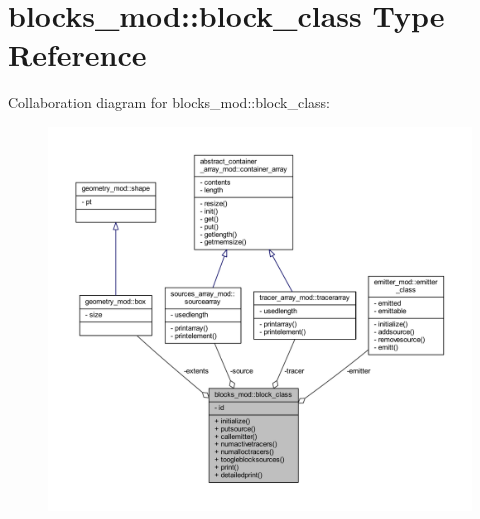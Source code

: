 \hypertarget{structblocks__mod_1_1block__class}{}\section{blocks\+\_\+mod\+:\+:block\+\_\+class Type Reference}
\label{structblocks__mod_1_1block__class}


Collaboration diagram for blocks\+\_\+mod\+:\+:block\+\_\+class\+:\nopagebreak
\begin{figure}[H]
\begin{center}
\leavevmode
\includegraphics[width=350pt]{structblocks__mod_1_1block__class__coll__graph}
\end{center}
\end{figure}
